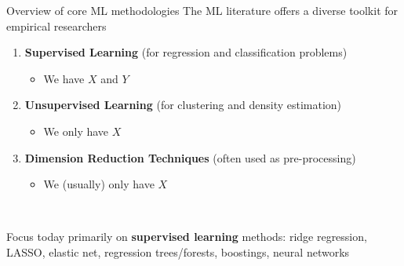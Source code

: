 \documentclass[xcolor=table, aspectratio=169]{beamer}
\newcommand{\alertbf}[1]{\alert{\textbf{#1}}}
\begin{document}
\begin{frame}{Overview of core ML methodologies}
The ML literature offers a diverse toolkit for empirical researchers
        \begin{enumerate}
            \item \alertbf{Supervised Learning} (for regression and classification problems)
            \begin{itemize}
                \item We have $X$ and $Y$
            \end{itemize}
            \item \alertbf{Unsupervised Learning} (for clustering and density estimation)
            \begin{itemize}
                \item We only have $X$
            \end{itemize}
            \item \alertbf{Dimension Reduction Techniques} (often used as pre-processing)
            \begin{itemize}
                \item We (usually) only have $X$
            \end{itemize}
        \end{enumerate}

        ~

Focus today primarily on \alertbf{supervised learning} methods: ridge regression, LASSO, elastic net, regression trees/forests, boostings, neural networks

\end{frame}
\end{document}
